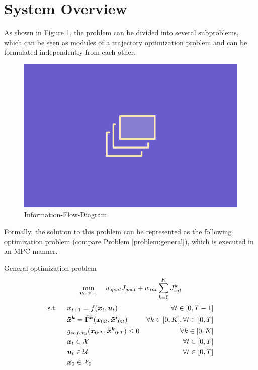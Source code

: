\section{System Overview}
\label{text:approach/overview}
As shown in Figure \ref{img:information_flow}, the problem can be divided into several subproblems, which can be seen as modules of a trajectory optimization problem and can be formulated independently from each other. 

\begin{figure}[!ht]
\begin{center}
\includegraphics[width=\imgwidth]{images/placeholder.png}
\caption{Information-Flow-Diagram}
\label{img:information_flow}
\end{center}
\end{figure}

Formally, the solution to this problem can be represented as the following optimization problem (compare Problem \ref{problem:general}), which is executed in an MPC-manner. \\

\begin{problem}{\textrm{General optimization problem}}
\begin{equation}
\min_{\boldsymbol{u}_{0:T-1}} \quad w_{goal} J_{goal} + w_{int} \sum_{k=0}^K J_{int}^k
\end{equation}
\begin{align}
\textrm{s.t. } \quad & \x_{t+1} = \f(\x_t, \u_t) & \forall t \in [0, T - 1] \\
& \xped[k] = \distmodel[k](\x_{0:t}, \xped[i]_{0:t}) & \forall k \in [0, K], \forall t \in [0, T]\\
& g_{safety}(\x_{0:T}, \xped[k]_{0:T}) \leq 0 & \forall k \in [0, K] \\
& \x_t \in \xset & \forall t \in [0, T]\\
& \u_t \in \uset & \forall t \in [0, T]\\
& \x_0 \in \xset_0
\end{align} 
\label{problem:general}
\end{problem}

